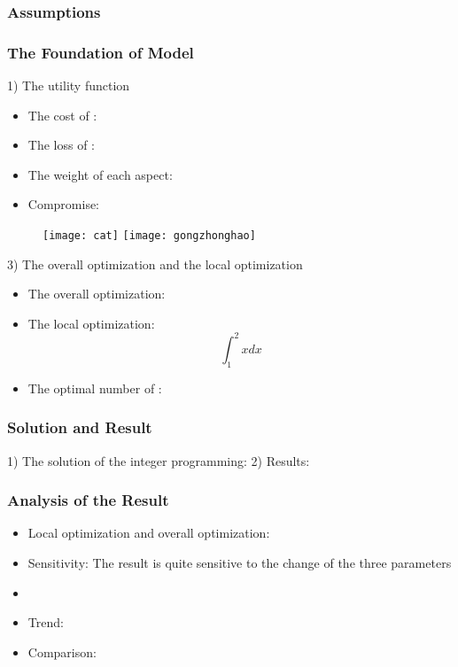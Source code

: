 \documentclass{apmcmthesis}
\begin{document}
\subsubsection{Assumptions}


\subsubsection{The Foundation of Model}
1) The utility function

\begin{itemize}
\item The cost of       :
\item The loss of       :
\item The weight of each aspect:
\item Compromise:
\end{itemize}



\begin{figure}[!ht]
  \centering
  \texttt{[image: cat]}  \quad  \texttt{[image: gongzhonghao]}
  \caption{}\label{cat1}
\end{figure}



3) The overall optimization and the local optimization

\begin{itemize}
\item The overall optimization:
\item The local optimization:
$$
\int_{1}^{2} x d x
 $$
\item The optimal number of        :
\end{itemize}



\subsubsection{Solution and Result}
1) The solution of the integer programming:
2) Results:
\subsubsection{Analysis of the Result}
\begin{itemize}
\item Local optimization and overall optimization:
\item Sensitivity: The result is quite sensitive to the change of the three parameters
\item
\item Trend:
\item Comparison:
\end{itemize}
\end{document}
